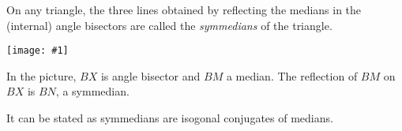 \documentclass{article}
\newcommand{\figura}[1]{\begin{center}\texttt{[image: \#1]}\end{center}}
\begin{document}
On any triangle, the three lines obtained by reflecting the medians in the (internal) angle bisectors are called the \emph{symmedians} of the triangle.

\figura{symmed}
In the picture, $BX$ is angle bisector and $BM$ a median. The reflection of $BM$ on $BX$ is $BN$, a symmedian.

It can be stated as symmedians are isogonal conjugates of medians.
\end{document}
